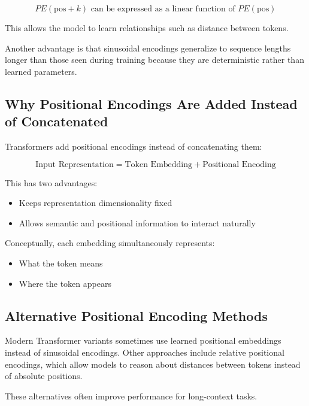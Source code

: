 \documentclass[11pt]{article}
\begin{document}
\[
PE(\text{pos}+k)
\text{ can be expressed as a linear function of }
PE(\text{pos})
\]

This allows the model to learn relationships such as distance between tokens.

Another advantage is that sinusoidal encodings generalize to sequence lengths longer than those seen during training because they are deterministic rather than learned parameters.

\subsection{Why Positional Encodings Are Added Instead of Concatenated}

Transformers add positional encodings instead of concatenating them:

\[
\text{Input Representation}
=
\text{Token Embedding}
+
\text{Positional Encoding}
\]

This has two advantages:

\begin{itemize}

\item Keeps representation dimensionality fixed
\item Allows semantic and positional information to interact naturally

\end{itemize}

Conceptually, each embedding simultaneously represents:

\begin{itemize}

\item What the token means
\item Where the token appears

\end{itemize}

\subsection{Alternative Positional Encoding Methods}

Modern Transformer variants sometimes use learned positional embeddings instead of sinusoidal encodings. Other approaches include relative positional encodings, which allow models to reason about distances between tokens instead of absolute positions.

These alternatives often improve performance for long-context tasks.
\end{document}
